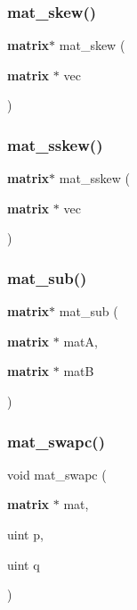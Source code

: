 \mbox{\label{mat_lib_8h_a6ccafcfe6ad7eb9dda5b10b6e54b7439}} 
\subsubsection{mat\+\_\+skew()}
{\footnotesize\ttfamily \textbf{ matrix}$\ast$ mat\+\_\+skew (\begin{DoxyParamCaption}\item[{\textbf{ matrix} $\ast$}]{vec }\end{DoxyParamCaption})}

\mbox{\label{mat_lib_8h_aa5fea5ab621e5ed51d1c39acd8aaab7f}} 
\subsubsection{mat\+\_\+sskew()}
{\footnotesize\ttfamily \textbf{ matrix}$\ast$ mat\+\_\+sskew (\begin{DoxyParamCaption}\item[{\textbf{ matrix} $\ast$}]{vec }\end{DoxyParamCaption})}

\mbox{\label{mat_lib_8h_a93a4960161f9dd4167b3a39f7ad3dacd}} 
\subsubsection{mat\+\_\+sub()}
{\footnotesize\ttfamily \textbf{ matrix}$\ast$ mat\+\_\+sub (\begin{DoxyParamCaption}\item[{\textbf{ matrix} $\ast$}]{matA,  }\item[{\textbf{ matrix} $\ast$}]{matB }\end{DoxyParamCaption})}

\mbox{\label{mat_lib_8h_a13a1f5a1ce3967628f2164f929aa2746}} 
\subsubsection{mat\+\_\+swapc()}
{\footnotesize\ttfamily void mat\+\_\+swapc (\begin{DoxyParamCaption}\item[{\textbf{ matrix} $\ast$}]{mat,  }\item[{uint}]{p,  }\item[{uint}]{q }\end{DoxyParamCaption})}

